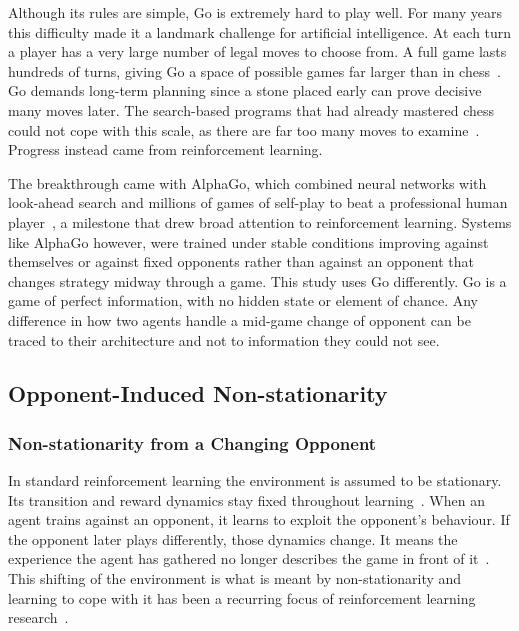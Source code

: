\documentclass[sigconf,nonacm]{acmart}
\begin{document}
Although its rules are simple, Go is extremely hard to play well. For many years
this difficulty made it a landmark challenge for artificial intelligence. At each
turn a player has a very large number of legal moves to choose from. A full game
lasts hundreds of turns, giving Go a space of possible games far larger than in
chess~\cite{silver2016mastering}.
Go demands long-term planning since a stone placed early can prove decisive
many moves later. The search-based programs that had already mastered chess could
not cope with this scale, as there are far too many moves to examine~\cite{campbell2002deepblue}. Progress
instead came from reinforcement learning.

The breakthrough came with AlphaGo, which combined neural networks with look-ahead search and millions of games of self-play to beat a professional human player~\cite{silver2016mastering}, a milestone that drew broad attention to reinforcement learning. Systems like AlphaGo however, were trained under stable conditions improving against themselves or against fixed opponents rather
than against an opponent that changes strategy midway through a game. This study
uses Go differently. Go is a game of perfect information, with no hidden state or
element of chance. Any difference in how two agents handle a mid-game change of
opponent can be traced to their architecture and not to information they could not see.

\subsection{Opponent-Induced Non-stationarity}
\subsubsection{Non-stationarity from a Changing Opponent}
In standard reinforcement learning the environment is assumed to be stationary.
Its transition and reward dynamics stay fixed throughout
learning~\cite{sutton2018reinforcement}. When
an agent trains against an opponent, it learns to exploit the opponent's behaviour. If the opponent later plays differently, those dynamics change. It means the experience the agent has gathered no longer describes the game in front of it~\cite{littman1994markov}. This shifting of the environment is what is meant by non-stationarity and learning to cope with it has been a recurring focus of reinforcement learning research~\cite{busoniu2010overview, padakandla2022survey}.
\end{document}
